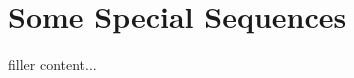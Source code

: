 \documentclass[../../templates/section]{subfiles}
\begin{document}
\section{Some Special Sequences}\label{sec:some-special-sequences}

filler content...
\end{document}
